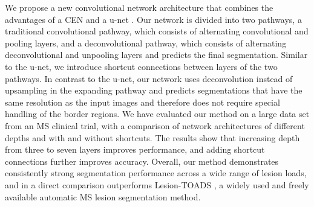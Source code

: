 We propose a new convolutional network architecture that combines the advantages
of a CEN \cite{brosch2015} and a u-net \cite{ronneberger2015}. Our network is
divided into two pathways, a traditional convolutional pathway, which consists
of alternating convolutional and pooling layers, and a deconvolutional pathway,
which consists of alternating deconvolutional and unpooling layers and predicts
the final segmentation. Similar to the u-net, we introduce shortcut connections
between layers of the two pathways. In contrast to the u-net, our network uses
deconvolution instead of upsampling in the expanding pathway and predicts
segmentations that have the same resolution as the input images and therefore
does not require special handling of the border regions. We have evaluated our
method on a large data set from an MS clinical trial, with a comparison of
network architectures of different depths and with and without shortcuts. The
results show that increasing depth from three to seven layers improves
performance, and adding shortcut connections further improves accuracy.
Overall, our method demonstrates consistently strong segmentation performance
across a wide range of lesion loads, and in a direct comparison outperforms
Lesion-TOADS \cite{shiee2010topology}, a widely used and freely available
automatic MS lesion segmentation method.




